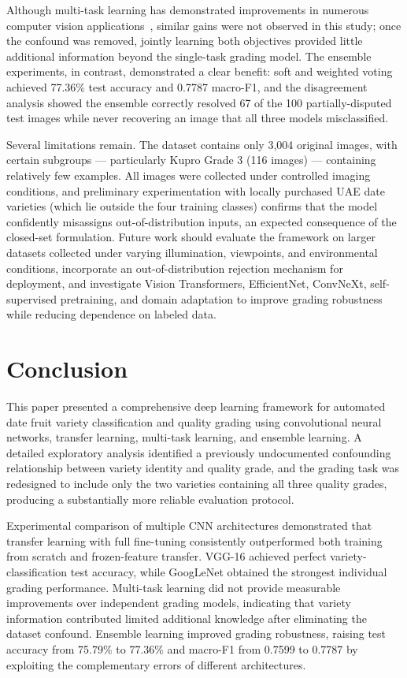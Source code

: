 \documentclass[conference]{IEEEtran}
\begin{document}
Although multi-task learning has demonstrated improvements in numerous computer vision applications~\cite{caruana1997multitask}, similar gains were not observed in this study; once the confound was removed, jointly learning both objectives provided little additional information beyond the single-task grading model. The ensemble experiments, in contrast, demonstrated a clear benefit: soft and weighted voting achieved 77.36\% test accuracy and 0.7787 macro-F1, and the disagreement analysis showed the ensemble correctly resolved 67 of the 100 partially-disputed test images while never recovering an image that all three models misclassified.

Several limitations remain. The dataset contains only 3{,}004 original images, with certain subgroups --- particularly Kupro Grade 3 (116 images) --- containing relatively few examples. All images were collected under controlled imaging conditions, and preliminary experimentation with locally purchased UAE date varieties (which lie outside the four training classes) confirms that the model confidently misassigns out-of-distribution inputs, an expected consequence of the closed-set formulation. Future work should evaluate the framework on larger datasets collected under varying illumination, viewpoints, and environmental conditions, incorporate an out-of-distribution rejection mechanism for deployment, and investigate Vision Transformers, EfficientNet, ConvNeXt, self-supervised pretraining, and domain adaptation to improve grading robustness while reducing dependence on labeled data.

\section{Conclusion}
This paper presented a comprehensive deep learning framework for automated date fruit variety classification and quality grading using convolutional neural networks, transfer learning, multi-task learning, and ensemble learning. A detailed exploratory analysis identified a previously undocumented confounding relationship between variety identity and quality grade, and the grading task was redesigned to include only the two varieties containing all three quality grades, producing a substantially more reliable evaluation protocol.

Experimental comparison of multiple CNN architectures demonstrated that transfer learning with full fine-tuning consistently outperformed both training from scratch and frozen-feature transfer. VGG-16 achieved perfect variety-classification test accuracy, while GoogLeNet obtained the strongest individual grading performance. Multi-task learning did not provide measurable improvements over independent grading models, indicating that variety information contributed limited additional knowledge after eliminating the dataset confound. Ensemble learning improved grading robustness, raising test accuracy from 75.79\% to 77.36\% and macro-F1 from 0.7599 to 0.7787 by exploiting the complementary errors of different architectures.
\end{document}
